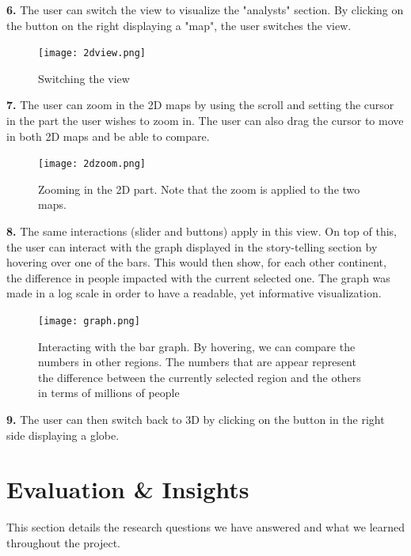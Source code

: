 \documentclass[12pt]{article}
\begin{document}
\textbf{6.} The user can switch the view to visualize the "analysts" section. By clicking on the button on the right displaying a "map", the user switches the view. %
\begin{figure}[h]
\centering
\texttt{[image: 2dview.png]}
\caption{Switching the view}
\end{figure} \newpage

\textbf{7.} The user can zoom in the 2D maps by using the scroll and setting the cursor in the part the user wishes to zoom in. The user can also drag the cursor to move in both 2D maps and be able to compare.
\begin{figure}[h]
\centering
\texttt{[image: 2dzoom.png]}
\caption{Zooming in the 2D part. Note that the zoom is applied to the two maps.}
\end{figure}

\textbf{8.} The same interactions (slider and buttons) apply in this view. On top of this, the user can interact with the graph displayed in the story-telling section by hovering over one of the bars. This would then show, for each other continent, the difference in people impacted with the current selected one. The graph was made in a log scale in order to have a readable, yet informative visualization.
\begin{figure}[h]
\centering
\texttt{[image: graph.png]}
\caption{Interacting with the bar graph. By hovering, we can compare the numbers in other regions. The numbers that are appear represent the difference between the currently selected region and the others in terms of millions of people}
\end{figure} \newpage

\textbf{9.} The user can then switch back to 3D by clicking on the button in the right side displaying a globe. 
\section{Evaluation \& Insights}
This section details the research questions we have answered and what we learned throughout the project.
\end{document}
